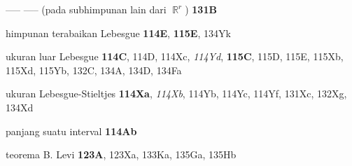 ----- ----- (pada subhimpunan lain dari $\BbbR^r$) {\bf 131B}





himpunan terabaikan Lebesgue {\bf 114E}, {\bf 115E}, 134Yk



ukuran luar Lebesgue {\bf 114C}, 114D, 114Xc, {\it 114Yd}, {\bf
115C}, 115D, 115E, 115Xb, 115Xd, 115Yb, 132C, 134A, 134D, 134Fa



ukuran Lebesgue-Stieltjes {\bf 114Xa}, {\it 114Xb}, 114Yb, 114Yc, 114Yf, 131Xc,
132Xg, 134Xd















panjang suatu interval {\bf 114Ab}




teorema B. Levi {\bf 123A}, 123Xa, 133Ka, 135Ga, 135Hb




















































\ifdim\pagewidth>467pt\fi

\tenrm=1.67pt












